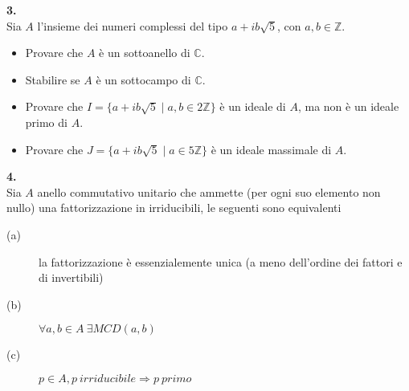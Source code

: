 \documentclass[italian,a4paper,11pt]
{article}
\newcommand{\Z}{\mathbb Z}
\newcommand{\C}{\mathbb{C}}
\newcommand{\acc}{\`}
\begin{document}
\vspace{0.4cm}
\noindent
\begin{Ex}\textbf{ 3.}\\
Sia $A$ l'insieme dei numeri complessi del tipo $a+ib\sqrt{5}$, con $a,b \in \Z$.
\begin{itemize}
	\item Provare che $A$ \`e un sottoanello di $\C$.
	\item Stabilire se $A$ \`e un sottocampo di $\C$.
	\item Provare che $I=\{a+ib\sqrt{5}\mid a,b\in 2\Z\}$ \`e un ideale di $A$, ma non \`e un ideale primo di $A$.
	\item Provare che $J=\{a+ib\sqrt{5}\mid a\in 5\Z\}$ \`e un ideale massimale di $A$.
\end{itemize}
\end{Ex}

\vspace{0.4cm}
\noindent
\begin{Ex}\textbf{ 4.}\\
Sia $A$ anello commutativo unitario che ammette (per ogni suo elemento non nullo) una fattorizzazione in irriducibili, le seguenti sono equivalenti
\begin{description}
	\item[(a)] la fattorizzazione \acc e essenzialemente unica (a meno dell'ordine dei fattori e di invertibili)
	\item[(b)] $\forall a,b \in A \ \exists MCD(a,b)$
	\item[(c)] $p\in A, p\ irriducibile \Rightarrow p  \ primo$
\end{description}
\end{Ex}
\end{document}
